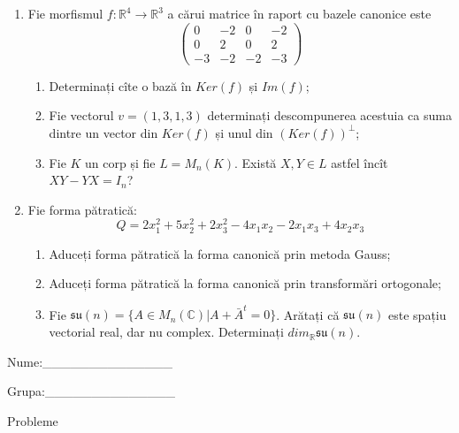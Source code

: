 \documentclass{article}
\begin{document}
\begin{enumerate}
 \item Fie morfismul $f:\mathbb{R}^4 \to \mathbb{R}^3$ a cărui matrice în raport cu bazele canonice este
$$\begin{pmatrix}
0&-2&0&-2\\
0&2&0&2\\
-3&-2&-2&-3
\end{pmatrix}$$

\begin{enumerate}
\item Determinați cîte o bază în $Ker(f)$ și $Im(f)$;
\item Fie vectorul $v=(1,3,1,3)$ determinați descompunerea acestuia ca suma dintre un vector din $Ker(f)$ și unul din $(Ker(f))^\perp$;
\item Fie $K$ un corp și fie $L=M_n(K)$. Există $X,Y \in L$ astfel încît $XY-YX=I_n$?  
\end{enumerate}
\item Fie forma pătratică:
$$Q= 2x_1^2+5x_2^2+2x_3^2-4x_1x_2-2x_1x_3+4x_2x_3$$

\begin{enumerate}
\item Aduceți forma pătratică la forma canonică prin metoda Gauss;
\item Aduceți forma pătratică la forma canonică prin transformări ortogonale;
\item Fie $\mathfrak{su}(n)=\{ A \in M_n(\mathbb{C}) | A+\bar{A}^t=0\}$. Arătați că $\mathfrak{su}(n)$ este spațiu vectorial real, dar nu complex.
Determinați $dim_{\mathbb{R}}\mathfrak{su}(n)$.
\end{enumerate}
\end{enumerate}
\newpage
\begin{flushright}
Nume:\_\_\_\_\_\_\_\_\_\_\_\_\_\_
 
 
Grupa:\_\_\_\_\_\_\_\_\_\_\_\_\_\_
\end{flushright}
\begin{center}
\vspace{2cm}
{\Large Probleme}
\vspace{2cm}
\end{center}
\end{document}
